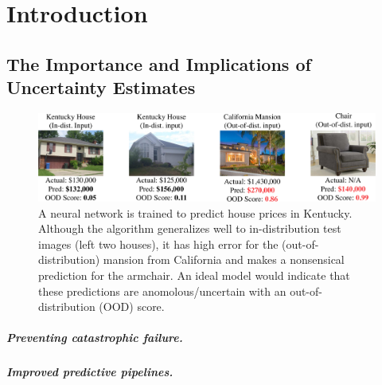 \chapter{Introduction}

\section{The Importance and Implications of Uncertainty Estimates}


\begin{figure}[t!]
  \centering
  \includegraphics[width=\textwidth]{figures/ood_teaser.pdf}
  \caption{
    A neural network is trained to predict house prices in Kentucky.
    Although the algorithm generalizes well to in-distribution test images (left two houses),
    it has high error for the (out-of-distribution) mansion from California and makes a nonsensical prediction for the armchair.
    An ideal model would indicate that these predictions are anomolous/uncertain with an out-of-distribution (OOD) score.
  }
  \label{fig:ood_teaser}
\end{figure}

\paragraph{Preventing catastrophic failure.}

\paragraph{Improved predictive pipelines.}

